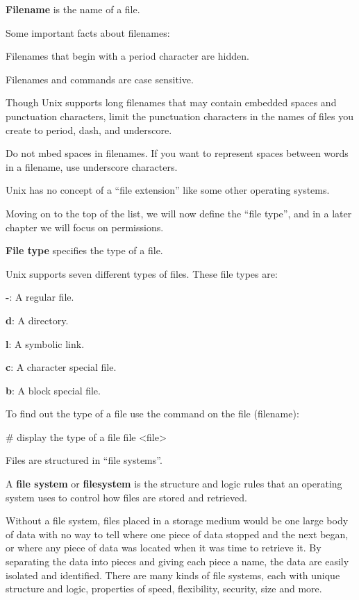 \bd[Filename]
\textbf{Filename} is the name of a file.
\ed

Some important facts about filenames:
\bit
\item Filenames that begin with a period character are hidden.
\item Filenames and commands are case sensitive.
\item Though Unix supports long filenames that may contain embedded spaces and punctuation characters, limit the
punctuation characters in the names of files you create to period, dash, and underscore.
\item Do not mbed spaces in filenames. If you want to represent spaces between words in a filename, use underscore
characters.
\item Unix has no concept of a ``file extension'' like some other operating systems.
\eit

Moving on to the top of the list, we will now define the ``file type'', and in a later chapter we will focus on
permissions.

\textbf{File type} specifies the type of a file.
\ed

Unix supports seven different types of files. These file types are:
\bit
\item \textbf{-}: A regular file.
\item \textbf{d}: A directory.
\item \textbf{l}: A symbolic link.
\item \textbf{c}: A character special file.
\item \textbf{b}: A block special file.
\eit

To find out the type of a file use the  command on the file (filename):
\begin{bash}
# display the type of a file
file <file>
\end{bash}

Files are structured in ``file systems''.

A \textbf{file system} or \textbf{filesystem} is the structure and logic rules that an operating system uses to control
how files are stored and retrieved.
\ed

Without a file system, files placed in a storage medium would be one large body of data with no way to tell where one
piece of data stopped and the next began, or where any piece of data was located when it was time to retrieve it. By
separating the data into pieces and giving each piece a name, the data are easily isolated and identified. There are
many kinds of file systems, each with unique structure and logic, properties of speed, flexibility, security, size
and more.

